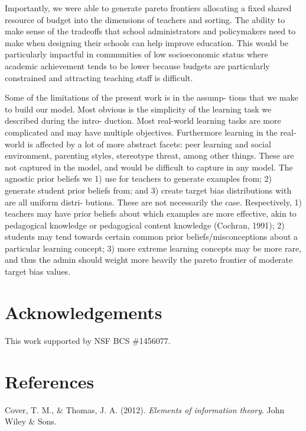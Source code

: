 \documentclass[man]{apa6}
\begin{document}
Importantly, we were able to generate pareto frontiers allocating a
fixed shared resource of budget into the dimensions of teachers and
sorting. The ability to make sense of the tradeoffs that school
administrators and policymakers need to make when designing their
schools can help improve education. This would be particularly impactful
in communities of low socioeconomic status where academic achievement
tends to be lower because budgets are particularly constrained and
attracting teaching staff is difficult.

Some of the limitations of the present work is in the assump- tions that
we make to build our model. Most obvious is the simplicity of the
learning task we described during the intro- duction. Most real-world
learning tasks are more complicated and may have multiple objectives.
Furthermore learning in the real-world is affected by a lot of more
abstract facets: peer learning and social environment, parenting styles,
stereotype threat, among other things. These are not captured in the
model, and would be difficult to capture in any model. The agnostic
prior beliefs we 1) use for teachers to generate examples from; 2)
generate student prior beliefs from; and 3) create target bias
distributions with are all uniform distri- butions. These are not
necessarily the case. Respectively, 1) teachers may have prior beliefs
about which examples are more effective, akin to pedagogical knowledge
or pedagogical content knowledge (Cochran, 1991); 2) students may tend
towards certain common prior beliefs/misconceptions about a particular
learning concept; 3) more extreme learning concepts may be more rare,
and thus the admin should weight more heavily the pareto frontier of
moderate target bias values.

\section{Acknowledgements}\label{acknowledgements}

This work supported by NSF BCS \#1456077.

\section{References}\label{references}

\setlength{\parindent}{-0.1in} \setlength{\leftskip}{0.125in} \noindent

\hypertarget{refs}{}
\hypertarget{ref-cover2012}{}
Cover, T. M., \& Thomas, J. A. (2012). \emph{Elements of information
theory}. John Wiley \& Sons.
\end{document}
